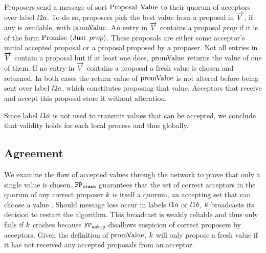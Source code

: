 Proposers send a message of sort $\operatorname{Proposal}\; \operatorname{Value}$ to their quorum of acceptors over label $l2a$.
To do so, proposers pick the best value from a proposal in $\overrightarrow{V}$, if any is available, with $\operatorname{promValue}$.
An entry in $\overrightarrow{V}$ contains a proposal $prop$ if it is of the form $\operatorname{Promise}\; \left(\operatorname{Just}\; prop\right)$.
These proposals are either some acceptor's initial accepted proposal or a proposal proposed by a proposer.
Not all entries in $\overrightarrow{V}$ contain a proposal but if at least one does, $\operatorname{promValue}$ returns the value of one of them.
If no entry in $\overrightarrow{V}$ contains a proposal a fresh value is chosen and returned.
In both cases the return value of $\operatorname{promValue}$ is not altered before being sent over label $l2a$, which constitutes proposing that value.
Acceptors that receive and accept this proposal store it without alteration.

Since label $l1a$ is not used to transmit values that can be accepted, we conclude that validity holds for each local process and thus globally.

\subsection{Agreement}
We examine the flow of accepted values through the network to prove that only a single value is chosen.
$\mathtt{FP_{crash}}$ guarantees that the set of correct acceptors in the quorum of any correct proposer $k$ is itself a quorum, \ie an accepting set that can choose a value \cite{Lamport06}.
Should message loss occur in labels $l1a$ or $l1b$, $k$ broadcasts its decision to restart the algorithm.
This broadcast is weakly reliable and thus only fails if $k$ crashes because $\mathtt{FP_{wskip}}$ disallows suspicion of correct proposers by acceptors.
Given the definition of $\operatorname{promValue}$, $k$ will only propose a fresh value if it has not received any accepted proposals from an acceptor.


